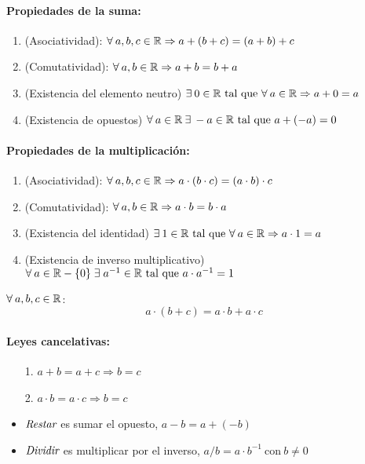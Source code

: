 
\paragraph{Propiedades de la suma:}
\begin{enumerate}
    \item (Asociatividad): $\forall \: a, b, c \in {\mathbb{R}} \Rightarrow a + (b + c) = (a + b) + c$
    \item (Comutatividad): $\forall \: a, b \in {\mathbb{R}} \Rightarrow a + b = b + a$
    \item (Existencia del elemento neutro) $\exists \: 0 \in {\mathbb{R}} \text{ tal que } \forall \: a \in {\mathbb{R}} \Rightarrow a + 0 = a$
    \item (Existencia de opuestos) $\forall \: a \in {\mathbb{R}} \: \exists \: -a \in {\mathbb{R}} \text{ tal que } a + (-a) = 0$   
\end{enumerate}

\paragraph{Propiedades de la multiplicación:}
\begin{enumerate}
    \item (Asociatividad): $\forall \: a, b, c \in {\mathbb{R}} \Rightarrow a \cdot (b \cdot c) = (a \cdot b) \cdot c$
    \item (Comutatividad): $\forall \: a, b \in {\mathbb{R}} \Rightarrow a \cdot b = b \cdot a$
    \item (Existencia del identidad) $\exists \: 1 \in {\mathbb{R}} \text{ tal que } \forall \: a \in {\mathbb{R}} \Rightarrow a \cdot 1 = a$
    \item (Existencia de inverso multiplicativo) $\forall \: a \in {\mathbb{R}}-\{0\} \; \exists \; a^{-1} \in {\mathbb{R}} \text{ tal que } a \cdot a^{-1} = 1$
\end{enumerate} 

$\forall \: a, b, c \in {\mathbb{R}}$:
$$a \cdot (b+c) = a \cdot b + a \cdot c$$

\paragraph{Leyes cancelativas:}
\begin{itemize}
    \item[1.] $a+b = a+c \Rightarrow b = c$
    \item[2.] $a \cdot b = a \cdot c \Rightarrow b = c$
    \item $\emph{Restar}$ es sumar el opuesto, $a-b = a + (-b)$
    \item $\emph{Dividir}$ es multiplicar por el inverso, $a/b = a \cdot b^{-1} \: \text{con}\: b \neq 0$
\end{itemize} 

